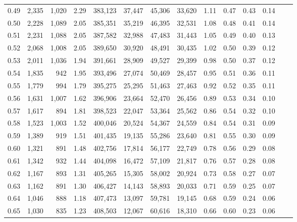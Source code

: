 \begin{tabular}{rrrrrrrrrrrrrr}
0.49 &   2,335 &  1,020 &    2.29 &  383,123 &   37,447 &  45,306 &  33,620 &  1.11 &  0.47 &  0.43 &      0.14 \\
0.50 &   2,228 &  1,089 &    2.05 &  385,351 &   35,219 &  46,395 &  32,531 &  1.08 &  0.48 &  0.41 &      0.14 \\
0.51 &   2,231 &  1,088 &    2.05 &  387,582 &   32,988 &  47,483 &  31,443 &  1.05 &  0.49 &  0.40 &      0.13 \\
0.52 &   2,068 &  1,008 &    2.05 &  389,650 &   30,920 &  48,491 &  30,435 &  1.02 &  0.50 &  0.39 &      0.12 \\
0.53 &   2,011 &  1,036 &    1.94 &  391,661 &   28,909 &  49,527 &  29,399 &  0.98 &  0.50 &  0.37 &      0.12 \\
0.54 &   1,835 &    942 &    1.95 &  393,496 &   27,074 &  50,469 &  28,457 &  0.95 &  0.51 &  0.36 &      0.11 \\
0.55 &   1,779 &    994 &    1.79 &  395,275 &   25,295 &  51,463 &  27,463 &  0.92 &  0.52 &  0.35 &      0.11 \\
0.56 &   1,631 &  1,007 &    1.62 &  396,906 &   23,664 &  52,470 &  26,456 &  0.89 &  0.53 &  0.34 &      0.10 \\
0.57 &   1,617 &    894 &    1.81 &  398,523 &   22,047 &  53,364 &  25,562 &  0.86 &  0.54 &  0.32 &      0.10 \\
0.58 &   1,523 &  1,003 &    1.52 &  400,046 &   20,524 &  54,367 &  24,559 &  0.84 &  0.54 &  0.31 &      0.09 \\
0.59 &   1,389 &    919 &    1.51 &  401,435 &   19,135 &  55,286 &  23,640 &  0.81 &  0.55 &  0.30 &      0.09 \\
0.60 &   1,321 &    891 &    1.48 &  402,756 &   17,814 &  56,177 &  22,749 &  0.78 &  0.56 &  0.29 &      0.08 \\
0.61 &   1,342 &    932 &    1.44 &  404,098 &   16,472 &  57,109 &  21,817 &  0.76 &  0.57 &  0.28 &      0.08 \\
0.62 &   1,167 &    893 &    1.31 &  405,265 &   15,305 &  58,002 &  20,924 &  0.73 &  0.58 &  0.27 &      0.07 \\
0.63 &   1,162 &    891 &    1.30 &  406,427 &   14,143 &  58,893 &  20,033 &  0.71 &  0.59 &  0.25 &      0.07 \\
0.64 &   1,046 &    888 &    1.18 &  407,473 &   13,097 &  59,781 &  19,145 &  0.68 &  0.59 &  0.24 &      0.06 \\
0.65 &   1,030 &    835 &    1.23 &  408,503 &   12,067 &  60,616 &  18,310 &  0.66 &  0.60 &  0.23 &      0.06 \\

\end{tabular}
